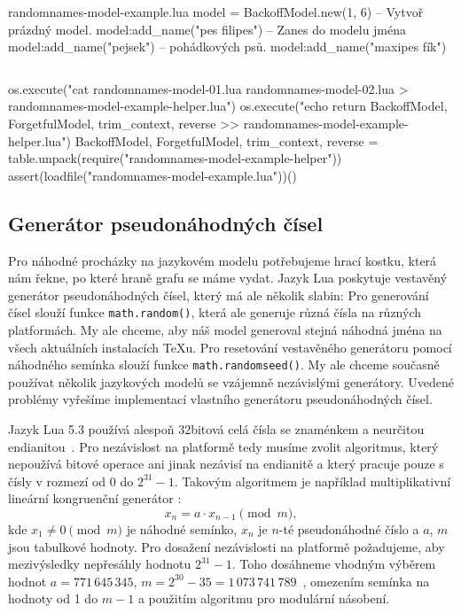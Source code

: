 \documentclass{csbulletin}
\newcommand\myinputminted[3][]{%
  \inputminted[#1]{#2}{#3}%
}
\newcommand\myinputminted[3][]{%
  \inputminted[#1]{#2}{code-placeholder.#2}%
}
\begin{document}
\begin{filecontents}{randomnames-model-example.lua}
model = BackoffModel.new(1, 6)        -- Vytvoř prázdný model.
model:add_name("pes filipes")         -- Zanes do modelu jména
model:add_name("pejsek")              -- pohádkových psů.
model:add_name("maxipes fík")
\end{filecontents}
\myinputminted[linenos=false]{lua}{randomnames-model-example.lua}

\noindent
\begin{luacode*}
os.execute("cat randomnames-model-01.lua randomnames-model-02.lua > randomnames-model-example-helper.lua")
os.execute("echo return {BackoffModel, ForgetfulModel, trim_context, reverse} >> randomnames-model-example-helper.lua")
BackoffModel, ForgetfulModel, trim_context, reverse = table.unpack(require("randomnames-model-example-helper"))
assert(loadfile("randomnames-model-example.lua"))()
\end{luacode*}

\subsection{Generátor pseudonáhodných čísel}
\label{sec:implementace-random}

Pro náhodné procházky na jazykovém modelu potřebujeme hrací kostku, která nám řekne, po které hraně grafu se máme vydat. Jazyk Lua poskytuje vestavěný generátor pseudonáhodných čísel, který má ale několik slabin: Pro generování čísel slouží funkce \texttt{math.random()}, která ale generuje různá čísla na různých platformách. My ale chceme, aby náš model generoval stejná náhodná jména na všech aktuálních instalacích \TeX u. Pro resetování vestavěného generátoru pomocí náhodného semínka slouží funkce \texttt{math.randomseed()}. My ale chceme současně používat několik jazykových modelů se vzájemně nezávislými generátory. Uvedené problémy vyřešíme implementací vlastního generátoru pseudonáhodných čísel.

Jazyk Lua 5.3 používá alespoň 32bitová celá čísla se znaménkem a neurčitou endianitou~\cite[sekce~2.1]{ierusalimschy2020lua}. Pro nezávislost na platformě tedy musíme zvolit algoritmus, který nepoužívá bitové operace ani jinak nezávisí na endianitě a který pracuje pouze s čísly v rozmezí od 0 do $2^{31} - 1$. Takovým algoritmem je například multiplikativní lineární kongruenční generátor \cite[sekce~7.1]{press2007numerical}:
\begin{equation}
x_n = a\cdot x_{n-1}\pmod{m},
\end{equation}
kde $x_1\neq0\pmod{m}$ je náhodné semínko, $x_n$ je $n$-té pseudonáhodné číslo a $a$, $m$ jsou tabulkové hodnoty.
Pro dosažení nezávislosti na platformě požadujeme, aby mezivýsledky nepřesáhly hodnotu $2^{31} - 1$. Toho dosáhneme vhodným výběrem hodnot $a = 771\,645\,345$, $m = 2^{30} - 35 = 1\,073\,741\,789$~\cite[tabulka~2]{l1999tables}, omezením semínka na hodnoty od 1 do $m - 1$ a použitím algoritmu pro modulární násobení.
\end{document}
